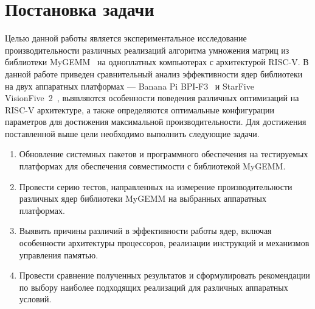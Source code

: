 
\section{Постановка задачи}
\label{sec:task}

Целью данной работы является экспериментальное исследование производительности различных реализаций алгоритма умножения матриц из библиотеки MyGEMM~\cite{mygemm_repo} на одноплатных компьютерах с архитектурой RISC-V. В данной работе приведен сравнительный анализ эффективности ядер библиотеки на двух аппаратных платформах --- Banana Pi BPI-F3~\cite{bananapi_f3_wiki} и StarFive VisionFive~2~\cite{visionfive2_wiki}, выявляются особенности поведения различных оптимизаций на RISC-V архитектуре, а также определяются оптимальные конфигурации параметров для достижения максимальной производительности. Для достижения поставленной выше цели необходимо выполнить следующие задачи.
\begin{enumerate}
    \item Обновление системных пакетов и программного обеспечения на тестируемых платформах для обеспечения совместимости с библиотекой MyGEMM.
    \item Провести серию тестов, направленных на измерение производительности различных ядер библиотеки MyGEMM на выбранных аппаратных платформах.
    \item Выявить причины различий в эффективности работы ядер, включая особенности архитектуры процессоров, реализации инструкций и механизмов управления памятью.
    \item Провести сравнение полученных результатов и сформулировать рекомендации по выбору наиболее подходящих реализаций для различных аппаратных условий.
\end{enumerate}